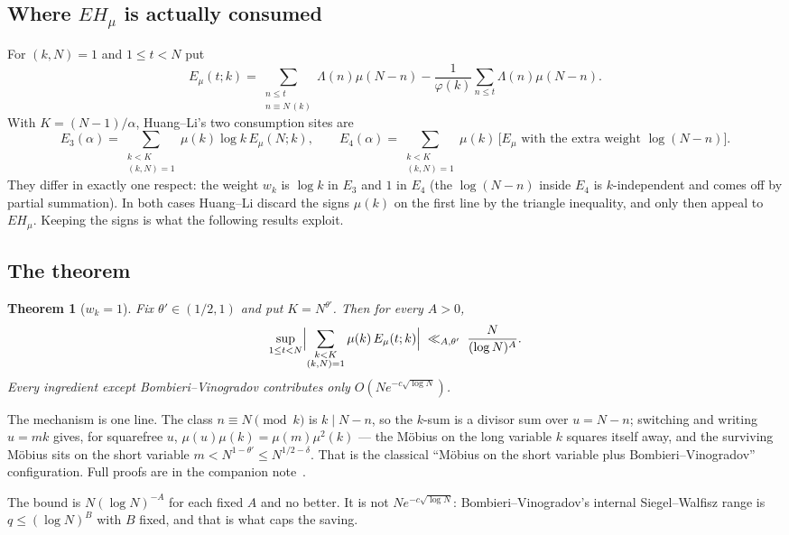 \documentclass[11pt,a4paper]{article}
\theoremstyle{plain}
\newtheorem{theorem}{Theorem}
\theoremstyle{definition}
\begin{document}
\subsection{Where $EH_\mu$ is actually consumed}

For $(k,N)=1$ and $1\le t<N$ put
\[
  E_\mu(t;k) = \sum_{\substack{n\le t\\ n\equiv N\,(k)}}
    \Lambda(n)\mu(N-n) - \frac{1}{\varphi(k)}\sum_{n\le t}
    \Lambda(n)\mu(N-n).
\]
With $K = (N-1)/\alpha$, Huang--Li's two consumption sites are
\[
  E_3(\alpha)=\!\!\sum_{\substack{k<K\\(k,N)=1}}\!\!\mu(k)\log k\,
  E_\mu(N;k),
  \qquad
  E_4(\alpha)=\!\!\sum_{\substack{k<K\\(k,N)=1}}\!\!\mu(k)\,
  \bigl[\text{$E_\mu$ with the extra weight }\log(N-n)\bigr].
\]
They differ in exactly one respect: the weight $w_k$ is $\log k$ in
$E_3$ and $1$ in $E_4$ (the $\log(N-n)$ inside $E_4$ is
$k$-independent and comes off by partial summation). In both cases
Huang--Li discard the signs $\mu(k)$ on the first line by the triangle
inequality, and only then appeal to $EH_\mu$. Keeping the signs is
what the following results exploit.

\subsection{The theorem}

\begin{theorem}[$w_k = 1$]\label{thm:A}
Fix $\theta' \in (1/2,1)$ and put $K = N^{\theta'}$. Then for every
$A>0$,
\[
  \sup_{1\le t<N}\Bigl|
   \sum_{\substack{k<K\\(k,N)=1}}\mu(k)\,E_\mu(t;k)\Bigr|
  \;\ll_{A,\theta'}\; \frac{N}{(\log N)^A}.
\]
Every ingredient except Bombieri--Vinogradov contributes only
$O(Ne^{-c\sqrt{\log N}})$.
\end{theorem}

The mechanism is one line. The class $n \equiv N \pmod k$ is
$k \mid N-n$, so the $k$-sum is a divisor sum over $u = N-n$;
switching and writing $u = mk$ gives, for squarefree $u$,
$\mu(u)\mu(k) = \mu(m)\mu^2(k)$ --- the M\"obius on the long variable
$k$ squares itself away, and the surviving M\"obius sits on the short
variable $m < N^{1-\theta'} \le N^{1/2-\delta}$. That is the classical
``M\"obius on the short variable plus Bombieri--Vinogradov''
configuration. Full proofs are in the companion note~\cite{ThmA}.

The bound is $N(\log N)^{-A}$ for each fixed $A$ and no better. It is
not $Ne^{-c\sqrt{\log N}}$: Bombieri--Vinogradov's internal
Siegel--Walfisz range is $q\le(\log N)^B$ with $B$ fixed, and that is
what caps the saving.
\end{document}
